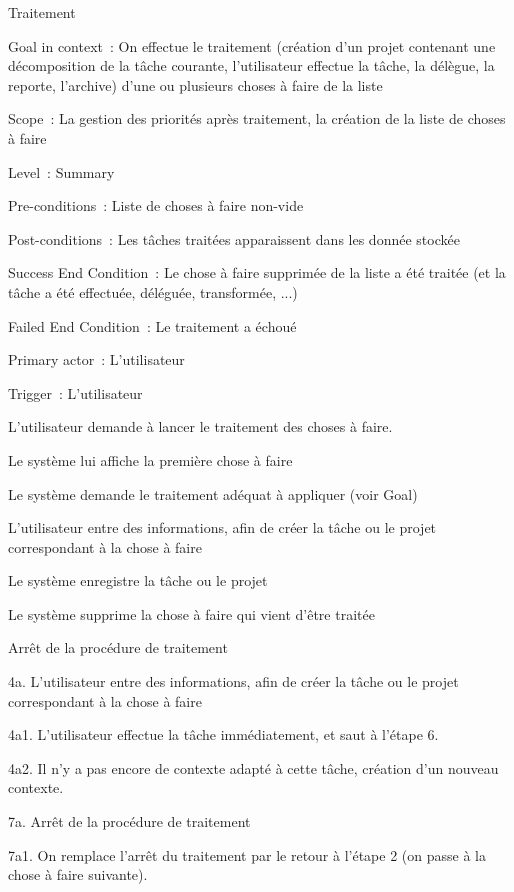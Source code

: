 	\begin{usecase}{Traitement}
	\begin{information}
	\item[Goal in context~:] On effectue le traitement (création d'un projet contenant une décomposition de la tâche courante, l'utilisateur effectue la tâche, la délègue, la reporte, l'archive) d'une ou plusieurs choses à faire de la liste
	\item[Scope~:] La gestion des priorités après traitement, la création de la liste de choses à faire
	\item[Level~:] Summary
	\item[Pre-conditions~:] Liste de choses à faire non-vide
	\item[Post-conditions~:] Les tâches traitées apparaissent dans les donnée stockée
	\item[Success End Condition~:] Le chose à faire supprimée de la liste a été traitée (et la tâche a été effectuée, déléguée, transformée, ...)
	\item[Failed End Condition~:] Le traitement a échoué
	\item[Primary actor~:] L'utilisateur
	\item[Trigger~:] L'utilisateur
	\\
	\end{information}
	\begin{scenario}
	\item L'utilisateur demande à lancer le traitement des choses à faire.
	\item Le système lui affiche la première chose à faire
	\item Le système demande le traitement adéquat à appliquer (voir Goal)
	\item L'utilisateur entre des informations, afin de créer la tâche ou le projet correspondant à la chose à faire
	\item Le système enregistre la tâche ou le projet
	\item Le système supprime la chose à faire qui vient d'être traitée
	\item Arrêt de la procédure de traitement
	\\
	\end{scenario}

	\begin{variation}
	\item[4a.] L'utilisateur entre des informations, afin de créer la tâche ou le projet correspondant à la chose à faire
	\item[4a1.] L'utilisateur effectue la tâche immédiatement, et saut à l'étape 6.
	\item[4a2.] Il n'y a pas encore de contexte adapté à cette tâche, création d'un nouveau contexte.
	\item[7a.] Arrêt de la procédure de traitement
	\item[7a1.] On remplace l'arrêt du traitement par le retour à l'étape 2 (on passe à la chose à faire suivante).
	\\
	\end{variation}


\end{usecase}
